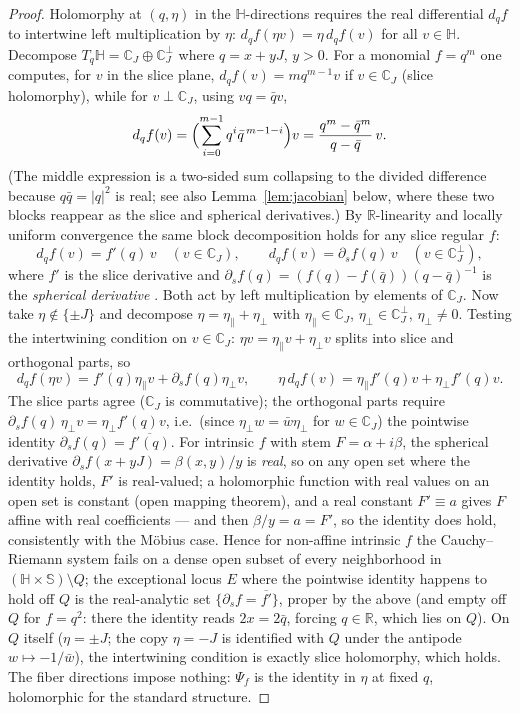 \documentclass[11pt]{amsart}
\theoremstyle{plain}
\theoremstyle{definition}
\theoremstyle{remark}
\newcommand{\HH}{\mathbb{H}}
\newcommand{\CC}{\mathbb{C}}
\newcommand{\RR}{\mathbb{R}}
\renewcommand{\SS}{\mathbb{S}}
\begin{document}
\begin{proof}
Holomorphy at $(q,\eta)$ in the $\HH$-directions requires the real differential $d_qf$ to
intertwine left multiplication by $\eta$: $d_qf(\eta v)=\eta\,d_qf(v)$ for all $v\in\HH$.
Decompose $T_q\HH=\CC_J\oplus\CC_J^\perp$ where $q=x+yJ$, $y>0$. For a monomial $f=q^m$ one
computes, for $v$ in the slice plane, $d_qf(v)=m q^{m-1}v$ if $v\in\CC_J$ (slice holomorphy), while
for $v\perp\CC_J$, using $vq=\bar qv$,
\[
d_qf(v)=\Bigl(\sum_{i=0}^{m-1}q^i\bar q^{\,m-1-i}\Bigr)v=\frac{q^m-\bar q^m}{q-\bar q}\,v .
\]
(The middle expression is a two-sided sum collapsing to the divided difference because
$q\bar q=|q|^2$ is real; see also Lemma~\ref{lem:jacobian} below, where these two blocks reappear
as the slice and spherical derivatives.) By $\RR$-linearity and locally uniform convergence the
same block decomposition holds for any slice regular $f$:
\begin{equation}\label{eq:blocks}
d_qf(v)=f'(q)\,v \quad (v\in\CC_J),\qquad
d_qf(v)=\partial_s f(q)\,v \quad (v\in\CC_J^\perp),
\end{equation}
where $f'$ is the slice derivative and
$\partial_sf(q)=(f(q)-f(\bar q))(q-\bar q)^{-1}$ is the \emph{spherical derivative}
\cite{GhiloniPerotti2011,GSSbook}. Both act by left multiplication by elements of $\CC_J$. Now take
$\eta\notin\{\pm J\}$ and decompose $\eta=\eta_\parallel+\eta_\perp$ with
$\eta_\parallel\in\CC_J$, $\eta_\perp\in\CC_J^\perp$, $\eta_\perp\neq0$. Testing the intertwining
condition on $v\in\CC_J$: $\eta v=\eta_\parallel v+\eta_\perp v$ splits into slice and orthogonal
parts, so
\[
d_qf(\eta v)=f'(q)\eta_\parallel v+\partial_sf(q)\eta_\perp v,
\qquad
\eta\,d_qf(v)=\eta_\parallel f'(q)v+\eta_\perp f'(q)v .
\]
The slice parts agree ($\CC_J$ is commutative); the orthogonal parts require
$\partial_sf(q)\,\eta_\perp v=\eta_\perp f'(q)v$, i.e.\ (since $\eta_\perp w=\bar w\eta_\perp$ for
$w\in\CC_J$) the pointwise identity $\partial_sf(q)=\overline{f'(q)}$. For intrinsic $f$ with
stem $F=\alpha+i\beta$, the spherical derivative $\partial_sf(x+yJ)=\beta(x,y)/y$ is
\emph{real}, so on any open set where the identity holds, $F'$ is real-valued; a holomorphic
function with real values on an open set is constant (open mapping theorem), and a real constant
$F'\equiv a$ gives $F$ affine with real coefficients --- and then $\beta/y=a=F'$, so the identity
does hold, consistently with the M\"obius case. Hence for non-affine intrinsic $f$ the
Cauchy--Riemann system fails on a dense open subset of every neighborhood in
$(\HH\times\SS)\setminus Q$; the exceptional locus $E$ where the pointwise identity happens to
hold off $Q$ is the real-analytic set $\{\partial_sf=\overline{f'}\}$, proper by the above (and
empty off $Q$ for $f=q^2$: there the identity reads $2x=2\bar q$, forcing $q\in\RR$, which lies
on $Q$). On $Q$ itself ($\eta=\pm J$; the copy $\eta=-J$ is
identified with $Q$ under the antipode $w\mapsto-1/\bar w$), the intertwining condition is exactly
slice holomorphy, which holds. The fiber directions impose nothing: $\Psi_f$ is the identity in
$\eta$ at fixed $q$, holomorphic for the standard structure.
\end{proof}
\end{document}
